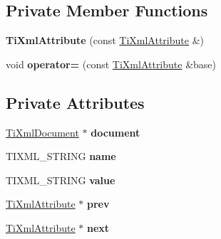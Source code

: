 \subsection*{\-Private \-Member \-Functions}
\begin{DoxyCompactItemize}
\item 
\hypertarget{class_ti_xml_attribute_aee53e434ace7271afc5ce51aeea0b400}{{\bfseries \-Ti\-Xml\-Attribute} (const \hyperlink{class_ti_xml_attribute}{\-Ti\-Xml\-Attribute} \&)}\label{class_ti_xml_attribute_aee53e434ace7271afc5ce51aeea0b400}

\item 
\hypertarget{class_ti_xml_attribute_a83b9c2a47dbfadf5029f2c0f13c18466}{void {\bfseries operator=} (const \hyperlink{class_ti_xml_attribute}{\-Ti\-Xml\-Attribute} \&base)}\label{class_ti_xml_attribute_a83b9c2a47dbfadf5029f2c0f13c18466}

\end{DoxyCompactItemize}
\subsection*{\-Private \-Attributes}
\begin{DoxyCompactItemize}
\item 
\hypertarget{class_ti_xml_attribute_ada41d3cff50cd33a78072806f88d4433}{\hyperlink{class_ti_xml_document}{\-Ti\-Xml\-Document} $\ast$ {\bfseries document}}\label{class_ti_xml_attribute_ada41d3cff50cd33a78072806f88d4433}

\item 
\hypertarget{class_ti_xml_attribute_afcbe165f33f08cf9b24daa33f0ee951a}{\-T\-I\-X\-M\-L\-\_\-\-S\-T\-R\-I\-N\-G {\bfseries name}}\label{class_ti_xml_attribute_afcbe165f33f08cf9b24daa33f0ee951a}

\item 
\hypertarget{class_ti_xml_attribute_ae9e4e5f442347434b1da43954cc1b411}{\-T\-I\-X\-M\-L\-\_\-\-S\-T\-R\-I\-N\-G {\bfseries value}}\label{class_ti_xml_attribute_ae9e4e5f442347434b1da43954cc1b411}

\item 
\hypertarget{class_ti_xml_attribute_aaf6c6272c625fbf38e571cbf570ea94a}{\hyperlink{class_ti_xml_attribute}{\-Ti\-Xml\-Attribute} $\ast$ {\bfseries prev}}\label{class_ti_xml_attribute_aaf6c6272c625fbf38e571cbf570ea94a}

\item 
\hypertarget{class_ti_xml_attribute_ae851adf61b80cf45b797fee77dea135f}{\hyperlink{class_ti_xml_attribute}{\-Ti\-Xml\-Attribute} $\ast$ {\bfseries next}}\label{class_ti_xml_attribute_ae851adf61b80cf45b797fee77dea135f}

\end{DoxyCompactItemize}
